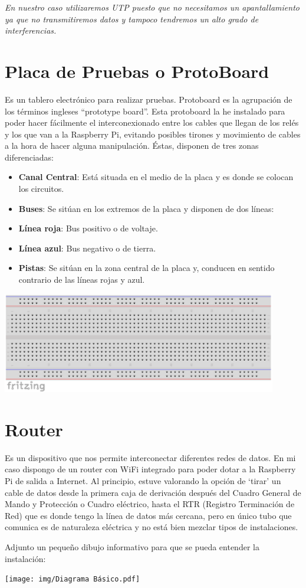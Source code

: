 \begin{itemize}
\emph{En nuestro caso utilizaremos UTP puesto que no necesitamos un apantallamiento ya que no transmitiremos datos y tampoco tendremos un alto grado de interferencias.}

\section{Placa de Pruebas o ProtoBoard}
Es un tablero electrónico para realizar pruebas. Protoboard es la agrupación de los términos ingleses “prototype board”.
Esta protoboard la he instalado para poder hacer fácilmente el interconexionado entre los cables que llegan de los relés y los que van a la Raspberry Pi, evitando posibles tirones y movimiento de cables a la hora de hacer alguna manipulación.
Éstas, disponen de tres zonas diferenciadas:

\begin{itemize}
    \item \textbf{Canal Central}: Está situada en el medio de la placa y es donde se colocan los circuitos.
    \item \textbf{Buses}: Se sitúan en los extremos de la placa y disponen de dos líneas:
    \item \textbf{Línea roja}: Bus positivo o de voltaje.
    \item \textbf{Línea azul}: Bus negativo o de tierra.
    \item \textbf{Pistas}: Se sitúan en la zona central de la placa y, conducen en sentido contrario de las líneas rojas y azul.
\end{itemize}

\begin{center}
\includegraphics[width=0.9\textwidth]{img/protoboard.pdf}
\end{center}

\section{Router}
Es un dispositivo que nos permite interconectar diferentes redes de datos. En mi caso dispongo de un router con WiFi integrado para poder dotar a la Raspberry Pi de salida a Internet.
Al principio, estuve valorando la opción de ‘tirar’ un cable de datos desde la primera caja de derivación después del Cuadro General de Mando y Protección o Cuadro eléctrico, hasta el RTR (Registro Terminación de Red) que es donde tengo la línea de datos más cercana, pero en único tubo que comunica es de naturaleza eléctrica y no está bien mezclar tipos de instalaciones.

Adjunto un pequeño dibujo informativo para que se pueda entender la instalación:
\begin{center}
\texttt{[image: img/Diagrama Básico.pdf]}
\end{center}


\end{itemize}

